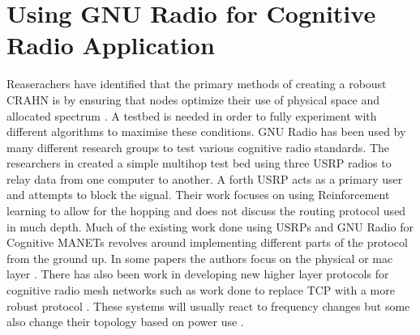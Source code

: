\section{Using GNU Radio for Cognitive Radio Application}

Reaserachers have identified that the primary methods of creating a roboust CRAHN is by ensuring
that nodes optimize their use of physical space and allocated spectrum \cite{6846075}. A testbed is
needed in order to fully experiment with different algorithms to maximise these conditions. 
GNU Radio has been used by many different research groups to test various cognitive radio
standards. The researchers in \cite{7141228} created a simple multihop test bed using
three USRP radios to relay data from one computer to another. A forth USRP acts as a primary
user and attempts to block the signal. Their work focuses on using Reinforcement learning to allow
for the hopping and does not discuss the routing protocol used in much depth. Much of the 
existing work done using USRPs and GNU Radio for Cognitive MANETs revolves around implementing
different parts of the protocol from the ground up. In some papers the authors focus on
the physical or mac layer \cite{5508221}. There has also been work in developing new higher 
layer protocols for cognitive radio mesh networks such as work done to replace 
TCP with a more robust protocol \cite{6686523}. These systems will usually react to frequency
changes but some also change their topology based on power use \cite{6983150}. 
